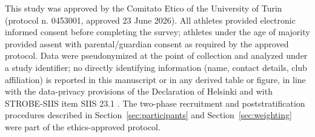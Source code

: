 \label{sec:ethics}
This study was approved by the Comitato Etico of the University of Turin (protocol n. 0453001, approved 23 June 2026). All athletes provided electronic informed consent before completing the survey; athletes under the age of majority provided assent with parental/guardian consent as required by the approved protocol. Data were pseudonymized at the point of collection and analyzed under a study identifier; no directly identifying information (name, contact details, club affiliation) is reported in this manuscript or in any derived table or figure, in line with the data-privacy provisions of the Declaration of Helsinki and with STROBE-SIIS item SIIS 23.1 \citep{bahr2020strobesiis}. The two-phase recruitment and poststratification procedures described in Section~\ref{sec:participants} and Section~\ref{sec:weighting} were part of the ethics-approved protocol.

